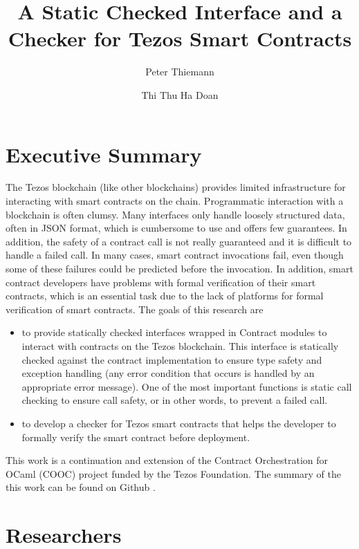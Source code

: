 \documentclass[a4paper,11pt]{article}
\title{A Static Checked Interface and a Checker for Tezos Smart Contracts
}
\author{Peter Thiemann}
\author{Thi Thu Ha Doan}
\affil{University of Freiburg, Germany}
\begin{document}
\maketitle{}

\section{Executive Summary}
\label{sec:executive-summary}
The Tezos blockchain (like other blockchains) provides limited infrastructure for interacting with smart contracts on the chain. Programmatic interaction with a blockchain is often clumsy. Many interfaces only handle loosely structured data, often in JSON format, which is cumbersome to use and offers few guarantees. In addition, the safety of a contract call is not really guaranteed and it is difficult to handle a failed call. In many cases, smart contract invocations fail, even though some of these failures could be predicted before the invocation. In addition, smart contract developers have problems with formal verification of their smart contracts, which is an essential task due to the lack of platforms for formal verification of smart contracts.
The goals of this research are 

\begin{itemize}
\item to provide statically checked interfaces wrapped in Contract modules to interact with contracts on the Tezos blockchain. This interface is statically checked against the contract implementation to ensure type safety and exception handling (any error condition that occurs is handled by an appropriate error message). One of the most important functions is static call checking to ensure call safety, or in other words, to prevent a failed call. 
\item to develop a checker for Tezos smart contracts that helps the developer to formally verify the smart contract before deployment.
\end{itemize}

This work is a continuation and extension of the Contract Orchestration for OCaml (COOC) project funded by the Tezos Foundation. The summary of the this work can be found on Github \cite{tezos-report}.

\section{Researchers}
\label{sec:researchers}
\end{document}
